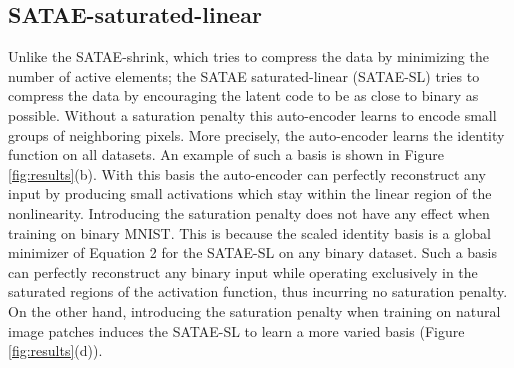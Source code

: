 \subsection{SATAE-saturated-linear} Unlike the SATAE-shrink, which tries to
compress the data by minimizing the number of active elements; the SATAE
saturated-linear (SATAE-SL) tries to compress the data by encouraging the
latent code to be as close to binary as possible. Without a saturation penalty
this auto-encoder learns to encode small groups of neighboring pixels. More
precisely, the auto-encoder learns the identity function on all datasets. An
example of such a basis is shown in Figure \ref{fig:results}(b). With this
basis the auto-encoder can perfectly reconstruct any input by producing small
activations which stay within the linear region of the nonlinearity.
Introducing the saturation penalty does not have any effect when training on
binary MNIST. This is because the scaled identity basis is a global minimizer
of Equation 2 for the SATAE-SL on any binary dataset. Such a basis can
perfectly reconstruct any binary input while operating exclusively in the
saturated regions of the activation function, thus incurring no saturation
penalty. On the other hand, introducing the saturation penalty when training on
natural image patches induces the SATAE-SL to learn a more varied basis (Figure
\ref{fig:results}(d)). 

